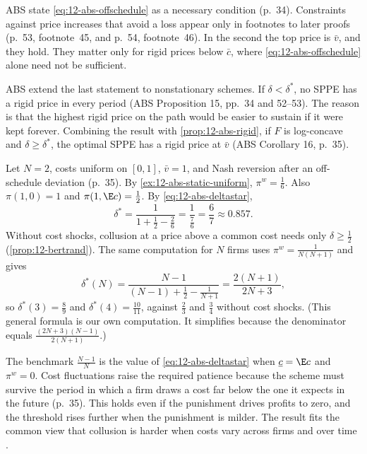 ABS state \eqref{eq:12-abs-offschedule} as a necessary condition (p.~34). Constraints against price increases that
avoid a loss appear only in footnotes to later proofs (p.~53, footnote~45, and p.~54, footnote~46). In the second
the top price is $\bar v$, and they hold. They matter only for rigid prices below $\bar c$, where \eqref{eq:12-abs-offschedule} alone need not be
sufficient.

ABS extend the last statement to nonstationary schemes. If $\delta < \delta^*$, no SPPE has a rigid price in every
period (ABS Proposition 15, pp.~34 and 52--53). The reason is that the highest rigid price on the path would be
easier to sustain if it were kept forever. Combining the result with \cref{prop:12-abs-rigid}, if $F$ is log-concave and
$\delta \ge \delta^*$, the optimal SPPE has a rigid price at $\bar v$ (ABS Corollary 16, p.~35).

\begin{example}\label{ex:12-abs-uniform}
Let $N = 2$, costs uniform on $[0,1]$, $\bar v = 1$, and Nash reversion after an off-schedule deviation (p.~35). By
\cref{ex:12-abs-static-uniform}, $\pi^w = \frac{1}{6}$. Also $\pi(1, 0) = 1$ and $\pi(1, \E c) = \frac{1}{2}$. By
\eqref{eq:12-abs-deltastar},
\begin{equation*}
\delta^* = \frac{1}{1 + \frac{1}{2} - \frac{2}{6}} = \frac{1}{\frac{7}{6}} = \frac{6}{7} \approx 0.857 .
\end{equation*}
Without cost shocks, collusion at a price above a common cost needs only $\delta \ge \frac{1}{2}$ (\cref{prop:12-bertrand}).
The same computation for $N$ firms uses $\pi^w = \frac{1}{N(N + 1)}$ and gives
\begin{equation*}
\delta^*(N) = \frac{N - 1}{(N - 1) + \frac{1}{2} - \frac{1}{N + 1}} = \frac{2(N + 1)}{2N + 3},
\end{equation*}
so $\delta^*(3) = \frac{8}{9}$ and $\delta^*(4) = \frac{10}{11}$, against $\frac{2}{3}$ and $\frac{3}{4}$ without
cost shocks. (This general formula is our own computation. It simplifies because the denominator equals
$\frac{(2N + 3)(N - 1)}{2(N + 1)}$.)
\end{example}

The benchmark $\frac{N - 1}{N}$ is the value of \eqref{eq:12-abs-deltastar} when $\underline c = \E c$ and
$\pi^w = 0$. Cost fluctuations raise the required patience because the scheme must survive the period in which a firm
draws a cost far below the one it expects in the future (p.~35). This holds even if the punishment drives profits to
zero, and the threshold rises further when the punishment is milder. The result fits the common view that collusion is
harder when costs vary across firms and over time \citep[p.~205]{Scherer1980}.

